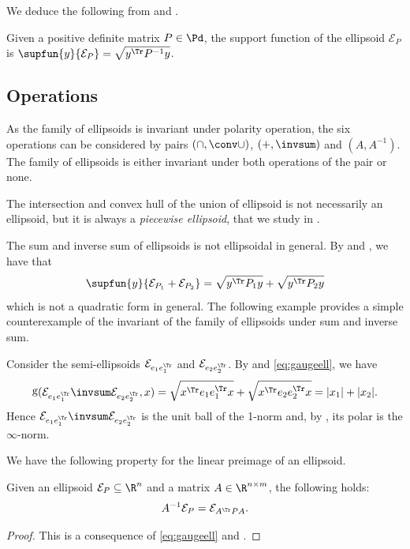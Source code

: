 \documentclass[11pt,twoside,a4paper,openright]{uclouvain-thesis}
\DeclareMathOperator{\gauge}{g}
\begin{document}
We deduce the following from  and .
\begin{myprop}
  \label{prop:supfunell}
  Given a positive definite matrix $P \in \Pd$, the support function of the ellipsoid $\mathcal{E}_P$ is $\supfun{y}{\mathcal{E}_P} = \sqrt{y^\Tr P^{-1} y}$.
\end{myprop}

\subsection{Operations}

As the family of ellipsoids is invariant under polarity operation, the
six operations can be considered by pairs $(\cap, \conv \cup)$, $(+, \invsum)$ and $(A, A^{-1})$.
The family of ellipsoids is either invariant under both operations of the pair or none.

The intersection and convex hull of the union of ellipsoid is not necessarily
an ellipsoid, but it is always a \emph{piecewise ellipsoid}, that we study in .

The sum and inverse sum of ellipsoids is not ellipsoidal in general.
By  and , we have that
\[ \supfun{y}{\mathcal{E}_{P_1} + \mathcal{E}_{P_2}} = \sqrt{y^\Tr P_1 y} + \sqrt{y^\Tr P_2 y} \]
which is not a quadratic form in general.
The following example provides a simple counterexample of the invariant of the family of ellipsoids under sum and inverse sum.
\begin{myexem}
  Consider the semi-ellipsoids $\mathcal{E}_{e_1e_1^\Tr}$ and $\mathcal{E}_{e_2e_2^\Tr}$.
  By  and \eqref{eq:gaugeell}, we have
  \[
    \gauge(\mathcal{E}_{e_1e_1^\Tr} \invsum \mathcal{E}_{e_2e_2^\Tr}, x)
    = \sqrt{x^\Tr e_1e_1^\Tr x} + \sqrt{x^\Tr e_2e_2^\Tr x}
    = |x_1| + |x_2|.
  \]
  Hence $\mathcal{E}_{e_1e_1^\Tr} \invsum \mathcal{E}_{e_2e_2^\Tr}$ is the unit ball
  of the 1-norm and, by , its polar is the $\infty$-norm.
\end{myexem}

We have the following property for the linear preimage of an ellipsoid.
\begin{myprop}
  \label{prop:ellpreimage}
  Given an ellipsoid $\mathcal{E}_P \subseteq \R^n$ and
  a matrix $A \in \R^{n \times m}$, the following holds:
  \[ A^{-1}\mathcal{E}_P = \mathcal{E}_{A^{\Tr}PA}. \]
  \begin{proof}
    This is a consequence of \eqref{eq:gaugeell} and .
  \end{proof}
\end{myprop}
\end{document}
